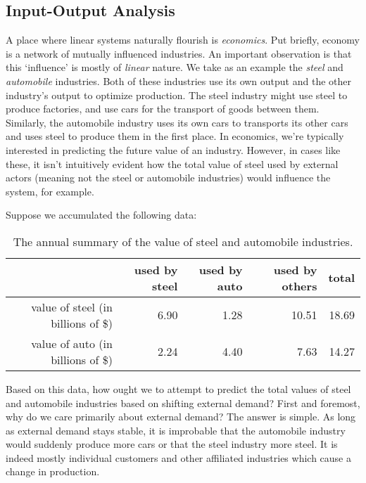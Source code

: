 \subsection{Input-Output Analysis}
\label{ssec:input-output-analysis}

A place where linear systems naturally flourish is \emph{economics}. Put
briefly, economy is a network of mutually influenced industries. An important
observation is that this `influence' is mostly of \emph{linear} nature. We take
as an example the \emph{steel} and \emph{automobile} industries. Both of these
industries use its own output and the other industry's output to optimize
production. The steel industry might use steel to produce factories, and use
cars for the transport of goods between them. Similarly, the automobile industry
uses its own cars to transports its other cars and uses steel to produce them in
the first place. In economics, we're typically interested in predicting the
future value of an industry. However, in cases like these, it isn't intuitively
evident how the total value of steel used by external actors (meaning not the
steel or automobile industries) would influence the system, for example.

Suppose we accumulated the following data:
\begin{table}[ht]
 \centering
 \begin{tabular}{r | r | r | r | r}
  & \textbf{used by steel} & \textbf{used by auto} & \textbf{used by others} &
  \textbf{total}\\
  \toprule
  value of steel (in billions of \$) & 6.90 & 1.28 & 10.51 & 18.69 \\
  value of auto (in billions of \$) & 2.24 & 4.40 & 7.63 & 14.27
 \end{tabular}

 \caption{The annual summary of the value of steel and automobile industries.}
 \label{table:steel-and-automobile}
\end{table}

Based on this data, how ought we to attempt to predict the total values of steel
and automobile industries based on shifting external demand? First and foremost,
why do we care primarily about external demand? The answer is simple. As long as
external demand stays stable, it is improbable that the automobile industry
would suddenly produce more cars or that the steel industry more steel. It is
indeed mostly individual customers and other affiliated industries which cause a
change in production.

